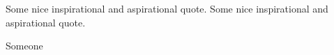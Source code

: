 
Some nice inspirational and aspirational quote. 
Some nice inspirational and aspirational quote. 
\bigskip

Someone

